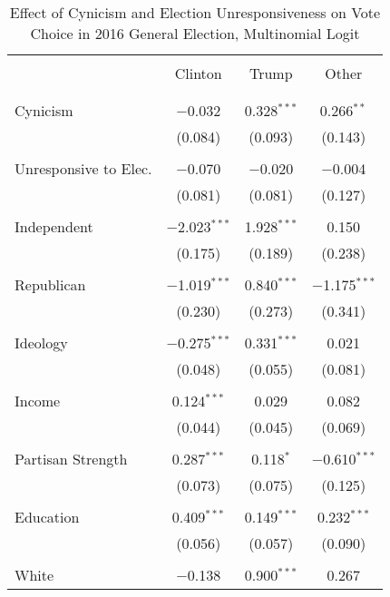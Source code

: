 \documentclass[12pt]{article}
\begin{document}
\begin{appendices}
\begin{refsection}
\begin{table}[!t] \centering 
  \caption{Effect of Cynicism and Election Unresponsiveness on Vote Choice in 2016 General Election, Multinomial Logit} 
  \label{tab:general} 
   \renewcommand{\arraystretch}{0.8}
\begin{adjustbox}{width=0.6\textwidth,center}
\begin{tabular}{@{\extracolsep{5pt}}lccc} 
\\[-1.8ex]\hline 
 \\[-2ex] 
 & Clinton & Trump & Other \\ 
\hline \\[-1.8ex] 
\hline \\[-1.8ex] 
 Cynicism & $-$0.032 & 0.328$^{***}$ & 0.266$^{**}$ \\ 
  & (0.084) & (0.093) & (0.143) \\ 
  & & & \\ 
 Unresponsive to Elec. & $-$0.070 & $-$0.020 & $-$0.004 \\ 
  & (0.081) & (0.081) & (0.127) \\ 
  & & & \\ 
 Independent & $-$2.023$^{***}$ & 1.928$^{***}$ & 0.150 \\ 
  & (0.175) & (0.189) & (0.238) \\ 
  & & & \\ 
 Republican & $-$1.019$^{***}$ & 0.840$^{***}$ & $-$1.175$^{***}$ \\ 
  & (0.230) & (0.273) & (0.341) \\ 
  & & & \\ 
 Ideology & $-$0.275$^{***}$ & 0.331$^{***}$ & 0.021 \\ 
  & (0.048) & (0.055) & (0.081) \\ 
  & & & \\ 
 Income & 0.124$^{***}$ & 0.029 & 0.082 \\ 
  & (0.044) & (0.045) & (0.069) \\ 
  & & & \\ 
 Partisan Strength & 0.287$^{***}$ & 0.118$^{*}$ & $-$0.610$^{***}$ \\ 
  & (0.073) & (0.075) & (0.125) \\ 
  & & & \\ 
 Education & 0.409$^{***}$ & 0.149$^{***}$ & 0.232$^{***}$ \\ 
  & (0.056) & (0.057) & (0.090) \\ 
  & & & \\ 
 White & $-$0.138 & 0.900$^{***}$ & 0.267 \\ 

\end{tabular}
\end{adjustbox}
\end{table}
\end{refsection}
\end{appendices}
\end{document}
